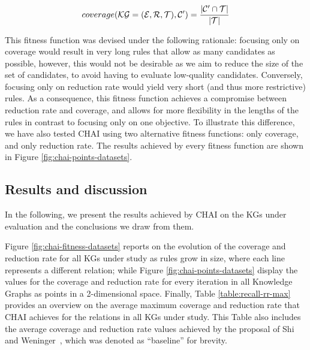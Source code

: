 \begin{equation*}
\label{eq:recall}
\begin{gathered}
coverage(\textmd{\textup{\ensuremath{\mathcal{K}}\ensuremath{\mathcal{G}}}} = (\mathcal{E}{}, \mathcal{R}{}, \mathcal{T}{}), \mathcal{C}') = \frac{|\mathcal{C}' \cap \mathcal{T}|}{|\mathcal{T}|}
\end{gathered}
\end{equation*}

This fitness function was devised under the following rationale: focusing only on coverage would result in very long rules that allow as many candidates as possible, however, this would not be desirable as we aim to reduce the size of the set of candidates, to avoid having to evaluate low-quality candidates. Conversely, focusing only on reduction rate would yield very short (and thus more restrictive) rules. As a consequence, this fitness function achieves a compromise between reduction rate and coverage, and allows for more flexibility in the lengths of the rules in contrast to focusing only on one objective. To illustrate this difference, we have also tested CHAI using two alternative fitness functions: only coverage, and only reduction rate. The results achieved by every fitness function are shown in Figure \ref{fig:chai-points-datasets}.

\subsection{Results and discussion}
In the following, we present the results achieved by CHAI on the KGs under evaluation and the conclusions we draw from them.

Figure \ref{fig:chai-fitness-datasets} reports on the evolution of the coverage and reduction rate for all KGs under study as rules grow in size, where each line represents a different relation; while Figure \ref{fig:chai-points-datasets} display the values for the coverage and reduction rate for every iteration in all Knowledge Graphs as points in a 2-dimensional space. Finally, Table \ref{table:recall-rr-max} provides an overview on the average maximum coverage and reduction rate that CHAI achieves for the relations in all KGs under study. This Table also includes the average coverage and reduction rate values achieved by the proposal of Shi and Weninger~\cite{shi18}, which was denoted as ``baseline'' for brevity.

